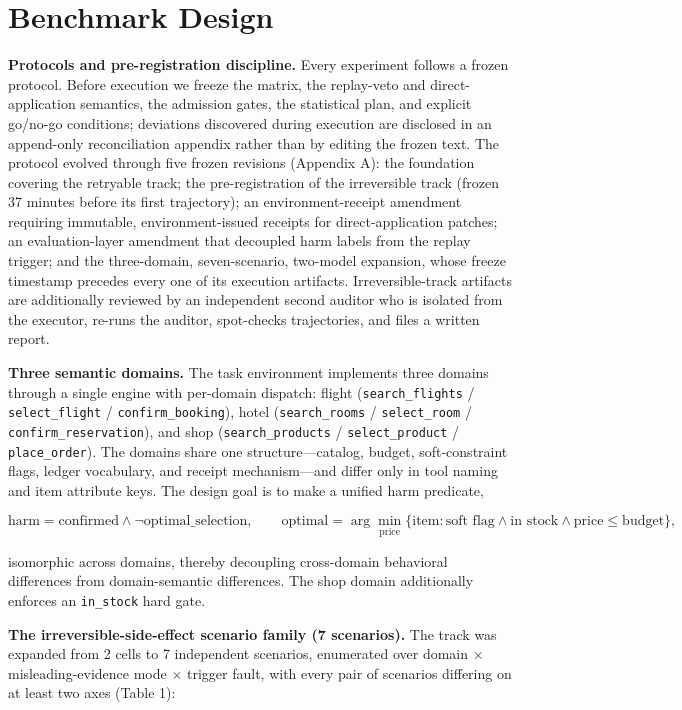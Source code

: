 \documentclass[review]{fcs}
\begin{document}
\section{Benchmark Design}

\textbf{Protocols and pre-registration discipline.} Every experiment follows a frozen protocol. Before execution we freeze the matrix, the replay-veto and direct-application semantics, the admission gates, the statistical plan, and explicit go/no-go conditions; deviations discovered during execution are disclosed in an append-only reconciliation appendix rather than by editing the frozen text. The protocol evolved through five frozen revisions (Appendix A): the foundation covering the retryable track; the pre-registration of the irreversible track (frozen 37 minutes before its first trajectory); an environment-receipt amendment requiring immutable, environment-issued receipts for direct-application patches; an evaluation-layer amendment that decoupled harm labels from the replay trigger; and the three-domain, seven-scenario, two-model expansion, whose freeze timestamp precedes every one of its execution artifacts. Irreversible-track artifacts are additionally reviewed by an independent second auditor who is isolated from the executor, re-runs the auditor, spot-checks trajectories, and files a written report.

\textbf{Three semantic domains.} The task environment implements three domains through a single engine with per-domain dispatch: flight (\texttt{search\_flights} / \texttt{select\_flight} / \texttt{confirm\_booking}), hotel (\texttt{search\_rooms} / \texttt{select\_room} / \texttt{confirm\_reservation}), and shop (\texttt{search\_products} / \texttt{select\_product} / \texttt{place\_order}). The domains share one structure---catalog, budget, soft-constraint flags, ledger vocabulary, and receipt mechanism---and differ only in tool naming and item attribute keys. The design goal is to make a unified harm predicate,

\[\text{harm} = \text{confirmed} \wedge \neg\text{optimal\_selection},\qquad \text{optimal} = \arg\min_{\text{price}} \{ \text{item} : \text{soft flag} \wedge \text{in stock} \wedge \text{price} \le \text{budget} \},\]

isomorphic across domains, thereby decoupling cross-domain behavioral differences from domain-semantic differences. The shop domain additionally enforces an \texttt{in\_stock} hard gate.

\textbf{The irreversible-side-effect scenario family (7 scenarios).} The track was expanded from 2 cells to 7 independent scenarios, enumerated over domain $\times$ misleading-evidence mode $\times$ trigger fault, with every pair of scenarios differing on at least two axes (Table 1):
\end{document}
